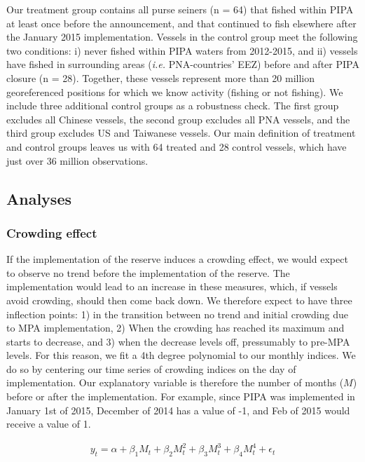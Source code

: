 \documentclass[9p,twocolumn,twoside,lineno]{pnas-new}
\begin{document}
Our treatment group contains all purse seiners (n = 64) that fished within PIPA at least once before the announcement, and that continued to fish elsewhere after the January 2015 implementation. Vessels in the control group meet the following two conditions: i) never fished within PIPA waters from 2012-2015, and ii) vessels have fished in surrounding areas (\emph{i.e.} PNA-countries' EEZ) before and after PIPA closure (n = 28). Together, these vessels represent more than 20 million georeferenced positions for which we know activity (fishing or not fishing). We include three additional control groups as a robustness check. The first group excludes all Chinese vessels, the second group excludes all PNA vessels, and the third group excludes US and Taiwanese vessels. Our main definition of treatment and control groups leaves us with 64 treated and 28 control vessels, which have just over 36 million observations.

\subsection{Analyses}

\subsubsection{Crowding effect}

If the implementation of the reserve induces a crowding effect, we would expect to observe no trend before the implementation of the reserve. The implementation would lead to an increase in these measures, which,  if vessels avoid crowding, should then come back down. We therefore expect to have three inflection points: 1) in the transition between no trend and initial crowding due to MPA implementation, 2) When the crowding has reached its maximum and starts to decrease, and 3) when the decrease levels off, pressumably to pre-MPA levels. For this reason, we fit a 4th degree polynomial to our monthly indices. We do so by centering our time series of crowding indices on the day of implementation. Our explanatory variable is therefore the number of months ($M$) before or after the implementation. For example, since PIPA was implemented in January 1st of 2015, December of 2014 has a value of -1, and Feb of 2015 would receive a value of 1.

\begin{figure}
\begin{align}
y_t = \alpha + \beta_1 M_t + \beta_2 M_t^2 + \beta_3 M_t^3 + \beta_4 M_t ^4 + \epsilon_t
\label{eqn:sp_corr}
\end{align}
\end{figure}
\end{document}
